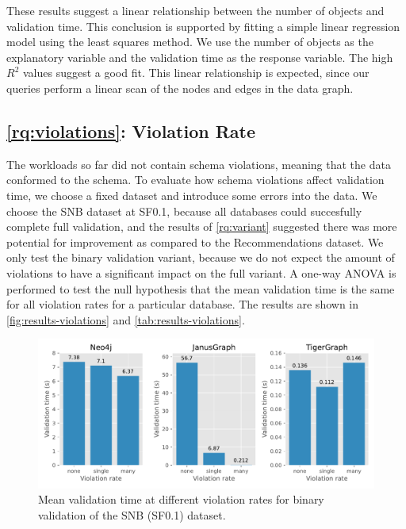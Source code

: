 \documentclass{report}
\theoremstyle{definition}
\begin{document}
These results suggest a linear relationship between the number of objects and validation time. This conclusion is supported by fitting a simple linear regression model using the least squares method. We use the number of objects as the explanatory variable and the validation time as the response variable. The high $R^2$ values suggest a good fit. This linear relationship is expected, since our queries perform a linear scan of the nodes and edges in the data graph.

\subsection{\ref*{rq:violations}: Violation Rate}
\label{sec:results-violations}

The workloads so far did not contain schema violations, meaning that the data conformed to the schema. To evaluate how schema violations affect validation time, we choose a fixed dataset and introduce some errors into the data. We choose the SNB dataset at SF0.1, because all databases could succesfully complete full validation, and the results of \ref*{rq:variant} suggested there was more potential for improvement as compared to the Recommendations dataset. We only test the binary validation variant, because we do not expect the amount of violations to have a significant impact on the full variant. A one-way ANOVA is performed to test the null hypothesis that the mean validation time is the same for all violation rates for a particular database. The results are shown in \autoref{fig:results-violations} and \autoref{tab:results-violations}.

\begin{figure}[t]
  \centering
  \includegraphics[scale=0.5]{figures/results-violations.pdf}
  \caption[Mean validation time at different violation rates]{Mean validation time at different violation rates for binary validation of the SNB (SF0.1) dataset.}
  \label{fig:results-violations}
\end{figure}
\end{document}
